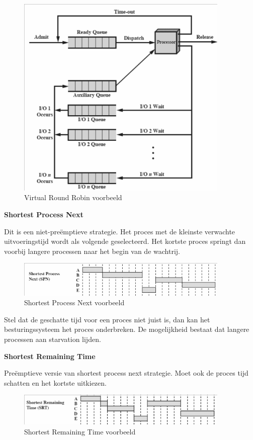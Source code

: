\begin{figure}[htp]
    \centering
            \includegraphics[width=4in]{img/virtualroundrobin.png}
        \caption{Virtual Round Robin voorbeeld}
    \label{fig:Virtual Round Robin voorbeeld}
\end{figure}

\textbf{Shortest Process Next}

Dit is een niet-preëmptieve strategie. Het proces met de kleinste verwachte uitvoeringstijd wordt als volgende geselecteerd. Het kortste proces springt dan voorbij langere processen naar het begin van de wachtrij.

\begin{figure}[htp]
    \centering
            \includegraphics[width=4in]{img/spn.png}
        \caption{Shortest Process Next voorbeeld}
    \label{fig:Shortest Process Next voorbeeld}
\end{figure}

Stel dat de geschatte tijd voor een proces niet juist is, dan kan het besturingssysteem het proces onderbreken. De mogelijkheid bestaat dat langere processen aan starvation lijden.

\textbf{Shortest Remaining Time}

Preëmptieve versie van shortest process next strategie. Moet ook de proces tijd schatten en het kortste uitkiezen.

\begin{figure}[htp]
    \centering
            \includegraphics[width=4in]{img/srt.png}
        \caption{Shortest Remaining Time voorbeeld}
    \label{fig:Shortest Remaining Time voorbeeld}
\end{figure}

